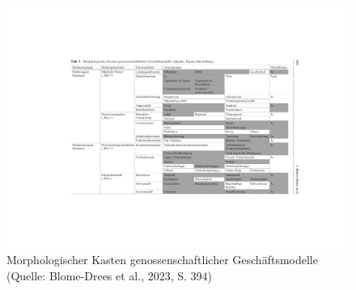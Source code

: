 \clearpage
\begin{figure}[htbp]
\centering
\includegraphics[angle=90,width=\textwidth,height=0.8\textheight,keepaspectratio]{tabelle_gimp.png}
\caption{Morphologischer Kasten genossenschaftlicher Geschäftsmodelle (Quelle: Blome-Drees et al., 2023, S. 394)}
\label{tab:morphologischer_kasten}
\end{figure}
\clearpage
